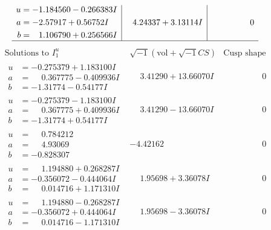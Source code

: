 \documentclass[1p]{elsarticle_modified}
\theoremstyle{definition}
\newcommand{\I}{\sqrt{-1}}
\begin{document}
$$\begin{array}{c|c|c}
\begin{aligned}
u &= -1.184560 - 0.266383 I \\
a &= -2.57917 + 0.56752 I \\
b &= \phantom{-}1.106790 + 0.256566 I\end{aligned}
 & \phantom{-}4.24337 + 3.13114 I & \phantom{-0.000000 } 0\\
 \hline 
 \end{array}$$\newpage$$\begin{array}{c|c|c}  
\text{Solutions to }I^u_{1}& \I (\text{vol} + \sqrt{-1}CS) & \text{Cusp shape}\\
 \hline 
\begin{aligned}
u &= -0.275379 + 1.183100 I \\
a &= \phantom{-}0.367775 - 0.409936 I \\
b &= -1.31774 - 0.54177 I\end{aligned}
 & \phantom{-}3.41290 + 13.66070 I & \phantom{-0.000000 } 0 \\ \hline\begin{aligned}
u &= -0.275379 - 1.183100 I \\
a &= \phantom{-}0.367775 + 0.409936 I \\
b &= -1.31774 + 0.54177 I\end{aligned}
 & \phantom{-}3.41290 - 13.66070 I & \phantom{-0.000000 } 0 \\ \hline\begin{aligned}
u &= \phantom{-}0.784212\phantom{ +0.000000I} \\
a &= \phantom{-}4.93069\phantom{ +0.000000I} \\
b &= -0.828307\phantom{ +0.000000I}\end{aligned}
 & -4.42162\phantom{ +0.000000I} & \phantom{-0.000000 } 0 \\ \hline\begin{aligned}
u &= \phantom{-}1.194880 + 0.268287 I \\
a &= -0.356072 - 0.444064 I \\
b &= \phantom{-}0.014716 + 1.171310 I\end{aligned}
 & \phantom{-}1.95698 + 3.36078 I & \phantom{-0.000000 } 0 \\ \hline\begin{aligned}
u &= \phantom{-}1.194880 - 0.268287 I \\
a &= -0.356072 + 0.444064 I \\
b &= \phantom{-}0.014716 - 1.171310 I\end{aligned}
 & \phantom{-}1.95698 - 3.36078 I & \phantom{-0.000000 } 0 \\ \hline\begin{aligned}

\end{aligned}
\end{array}$$
\end{document}
